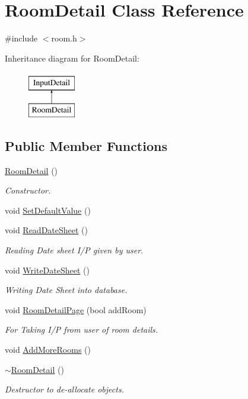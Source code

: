 \hypertarget{classRoomDetail}{\section{Room\-Detail Class Reference}
\label{classRoomDetail}
}


{\ttfamily \#include $<$room.\-h$>$}

Inheritance diagram for Room\-Detail\-:\begin{figure}[H]
\begin{center}
\leavevmode
\includegraphics[height=2.000000cm]{classRoomDetail}
\end{center}
\end{figure}
\subsection*{Public Member Functions}
\begin{DoxyCompactItemize}
\item 
\hyperlink{classRoomDetail_acbbb21580bc1591daf23e614011acc06}{Room\-Detail} ()
\begin{DoxyCompactList}\small\item\em Constructor. \end{DoxyCompactList}\item 
void \hyperlink{classRoomDetail_a117bed37b0f95b364b7133fe13afa9b7}{Set\-Default\-Value} ()
\item 
void \hyperlink{classRoomDetail_ab8a07fd05ab314e85b374191e38e8556}{Read\-Date\-Sheet} ()
\begin{DoxyCompactList}\small\item\em Reading Date sheet I/\-P given by user. \end{DoxyCompactList}\item 
void \hyperlink{classRoomDetail_a90d4fc5bf3497068efecb5c9ec13e887}{Write\-Date\-Sheet} ()
\begin{DoxyCompactList}\small\item\em Writing Date Sheet into database. \end{DoxyCompactList}\item 
void \hyperlink{classRoomDetail_ab2c0a691ce4dea82d16f991c66021931}{Room\-Detail\-Page} (bool add\-Room)
\begin{DoxyCompactList}\small\item\em For Taking I/\-P from user of room details. \end{DoxyCompactList}\item 
void \hyperlink{classRoomDetail_ac4d4701717acda86a95c68ef5abbab28}{Add\-More\-Rooms} ()
\item 
\hyperlink{classRoomDetail_ae65b9b167e75a7dc994c4e2021937c68}{$\sim$\-Room\-Detail} ()
\begin{DoxyCompactList}\small\item\em Destructor to de-\/allocate objects. \end{DoxyCompactList}\end{DoxyCompactItemize}

